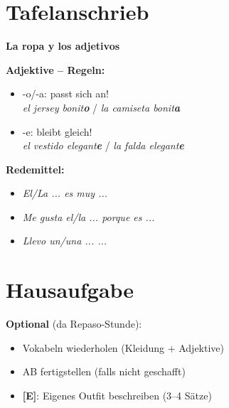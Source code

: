 \documentclass[11pt,a4paper]{article}
\newcommand{\erweiterung}{\textcolor{erweiterungpurple}{\textbf{[E]}}}
\begin{document}
\section{Tafelanschrieb}

\begin{tcolorbox}[colback=white, colframe=black, boxrule=0.5pt]
\begin{center}
\textbf{\large La ropa y los adjetivos}
\end{center}

\vspace{0.5em}

\textbf{Adjektive -- Regeln:}
\begin{itemize}[leftmargin=*]
    \item -o/-a: passt sich an! \\
    \textit{el jersey bonit\textbf{o}} / \textit{la camiseta bonit\textbf{a}}
    \item -e: bleibt gleich! \\
    \textit{el vestido elegant\textbf{e}} / \textit{la falda elegant\textbf{e}}
\end{itemize}

\vspace{0.5em}

\textbf{Redemittel:}
\begin{itemize}[leftmargin=*]
    \item \textit{El/La ... es muy ...}
    \item \textit{Me gusta el/la ... porque es ...}
    \item \textit{Llevo un/una ... ...}
\end{itemize}
\end{tcolorbox}

\section{Hausaufgabe}

\textbf{Optional} (da Repaso-Stunde):
\begin{itemize}
    \item Vokabeln wiederholen (Kleidung + Adjektive)
    \item AB fertigstellen (falls nicht geschafft)
    \item \erweiterung{}: Eigenes Outfit beschreiben (3--4 Sätze)
\end{itemize}
\end{document}

